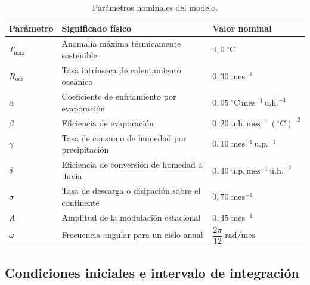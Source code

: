 \begin{table}[htbp]
    \centering
    \small
    \caption{Parámetros nominales del modelo.}
    \label{tab:parametros}
    \begin{tabular}{@{} l p{} l @{}}
        \toprule
        Parámetro & Significado físico & Valor nominal \\
        \midrule
        $T_{\max}$
        & Anomalía máxima térmicamente sostenible
        & $4{,}0\;{}^{\circ}\mathrm{C}$ \\[4pt]

        $R_{\mathrm{oce}}$
        & Tasa intrínseca de calentamiento oceánico
        & $0{,}30\;\mathrm{mes}^{-1}$ \\[4pt]

        $\alpha$
        & Coeficiente de enfriamiento por evaporación
        & $0{,}05\;{}^{\circ}\mathrm{C}\,
           \mathrm{mes}^{-1}\,\mathrm{u.h.}^{-1}$ \\[4pt]

        $\beta$
        & Eficiencia de evaporación
        & $0{,}20\;\mathrm{u.h.}\,
           \mathrm{mes}^{-1}\,({}^{\circ}\mathrm{C})^{-2}$ \\[4pt]

        $\gamma$
        & Tasa de consumo de humedad por precipitación
        & $0{,}10\;\mathrm{mes}^{-1}\,\mathrm{u.p.}^{-1}$ \\[4pt]

        $\delta$
        & Eficiencia de conversión de humedad a lluvia
        & $0{,}40\;\mathrm{u.p.}\,
           \mathrm{mes}^{-1}\,\mathrm{u.h.}^{-2}$ \\[4pt]

        $\sigma$
        & Tasa de descarga o disipación sobre el continente
        & $0{,}70\;\mathrm{mes}^{-1}$ \\[4pt]

        $A$
        & Amplitud de la modulación estacional
        & $0{,}45\;\mathrm{mes}^{-1}$ \\[4pt]

        $\omega$
        & Frecuencia angular para un ciclo anual
        & $\dfrac{2\pi}{12}\;\mathrm{rad/mes}$ \\
        \bottomrule
    \end{tabular}
\end{table}


\subsection{Condiciones iniciales e intervalo de integración}

